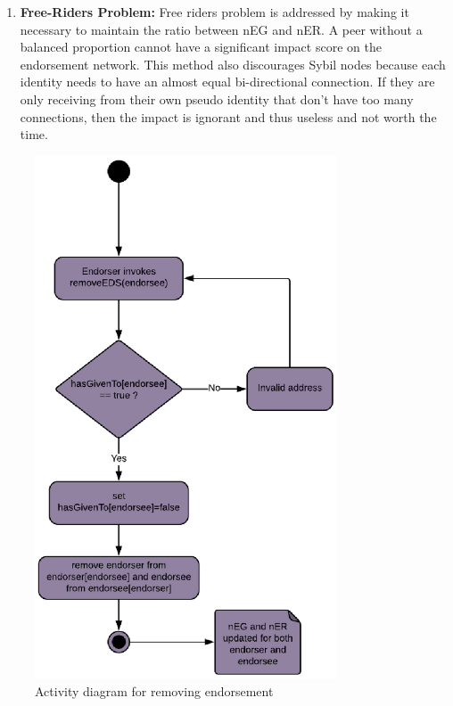 \begin{enumerate}
		the endorsement decision that an entity can take. Therefore, the design
		also considers removal of endorsement previously assigned. The removal
		of endorsement is captured by the figure  ~\ref{fig:removeEds}. 
	\item \textbf{Free-Riders Problem:} Free riders problem is addressed by
		making it necessary to maintain the ratio between nEG and nER. A peer
		without a balanced proportion cannot have a significant impact score on
		the endorsement network. This method also discourages Sybil nodes
		because each identity needs to have an almost equal bi-directional
		connection. If they are only receiving from their own pseudo identity
		that don't have too many connections, then the impact is ignorant and
		thus useless and not worth the time.
\end{enumerate}
\begin{figure}
	\centering
	\includegraphics[width=0.8\textwidth]{Images/ActivityDiagramRemoveEDS.eps}
	\caption{Activity diagram for removing endorsement}
	\label{fig:removeEds}
\end{figure}

